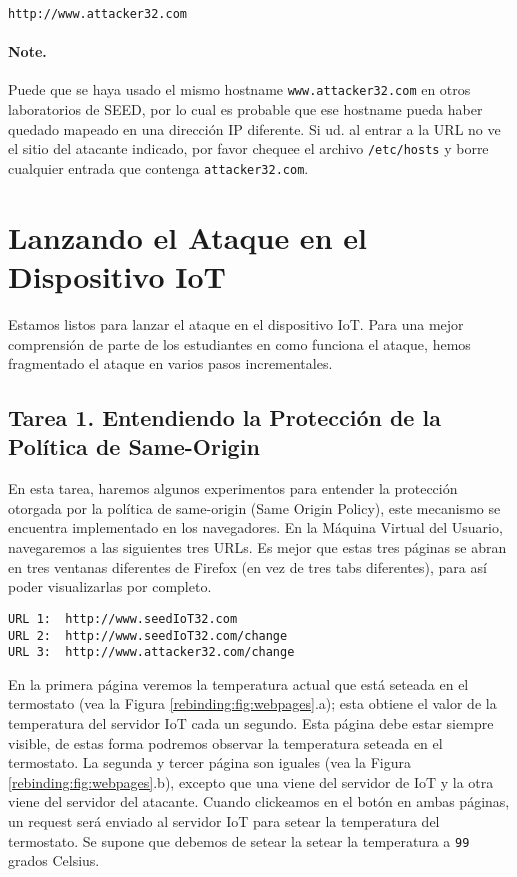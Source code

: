 \begin{lstlisting}
http://www.attacker32.com
\end{lstlisting}

\paragraph{Note.} Puede que se haya usado el mismo hostname \texttt{www.attacker32.com} en otros laboratorios de SEED, por lo cual es probable que ese hostname pueda haber quedado mapeado en una dirección IP diferente. Si ud. al entrar a la URL no ve el sitio del atacante indicado, por favor chequee el archivo \texttt{/etc/hosts} y borre cualquier entrada que contenga \texttt{attacker32.com}. 




\section{Lanzando el Ataque en el Dispositivo IoT}

Estamos listos para lanzar el ataque en el dispositivo IoT. Para una mejor comprensión de parte de los estudiantes en como funciona el ataque, hemos fragmentado el ataque en varios pasos incrementales.


\subsection{Tarea 1. Entendiendo la Protección de la Política de Same-Origin}

En esta tarea, haremos algunos experimentos para entender la protección otorgada por la política de same-origin (Same Origin Policy), este mecanismo se encuentra implementado en los navegadores.
En la Máquina Virtual del Usuario, navegaremos a las siguientes tres URLs. Es mejor que estas tres páginas se abran en tres ventanas diferentes de Firefox (en vez de tres tabs diferentes), para así poder visualizarlas por completo.


\begin{lstlisting}
URL 1:  http://www.seedIoT32.com
URL 2:  http://www.seedIoT32.com/change
URL 3:  http://www.attacker32.com/change
\end{lstlisting}

En la primera página veremos la temperatura actual que está seteada en el termostato (vea la Figura \ref{rebinding:fig:webpages}.a); esta obtiene el valor de la temperatura del servidor IoT cada un segundo. Esta página debe estar siempre visible, de estas forma podremos observar la temperatura seteada en el termostato.
La segunda y tercer página son iguales (vea la Figura \ref{rebinding:fig:webpages}.b), excepto que una viene del servidor de IoT y la otra viene del servidor del atacante. Cuando clickeamos en el botón en ambas páginas, un request será enviado al servidor IoT para setear la temperatura del termostato.
Se supone que debemos de setear la setear la temperatura a \texttt{99} grados Celsius.  

